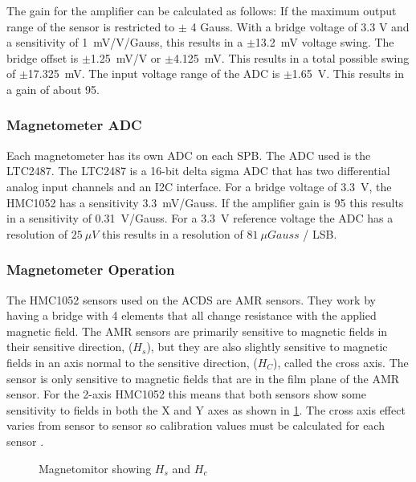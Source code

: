 The gain for the amplifier can be calculated as follows: If the maximum output range of the sensor is restricted to $\pm$ 4 Gauss. With a bridge voltage of 3.3 V and a sensitivity of 1~mV/V/Gauss, this results in a $\pm$13.2~mV voltage swing. The bridge offset is $\pm$1.25~mV/V or $\pm$4.125~mV. This results in a total possible swing of $\pm$17.325~mV. The input voltage range of the \ac{ADC} is $\pm$1.65~V. This results in a gain of about 95. 

\subsubsection{Magnetometer \acl{ADC}}

Each magnetometer has its own \ac{ADC} on each \ac{SPB}. The \ac{ADC} used is the LTC2487. The LTC2487 is a 16-bit delta sigma \ac{ADC} that has two differential analog input channels and an \ac{I2C} interface. For a bridge voltage of 3.3~V, the HMC1052 has a sensitivity 3.3~mV/Gauss. If the amplifier gain is 95 this results in a sensitivity of 0.31~V/Gauss. For a 3.3~V reference voltage the \ac{ADC} has a resolution of $25~\unit{\mu V}$ this results in a resolution of $81~\unit{\mu Gauss}$ / LSB.

\subsubsection{Magnetometer Operation}

The HMC1052 sensors used on the \ac{ACDS} are \ac{AMR} sensors. They work by having a bridge with 4 elements that all change resistance with the applied magnetic field. The \ac{AMR} sensors are primarily sensitive to magnetic fields in their sensitive direction, ($H_s$), but they are also slightly sensitive to magnetic fields in an axis normal to the sensitive direction, ($H_C$), called the cross axis. The sensor is only sensitive to magnetic fields that are in the film plane of the \ac{AMR} sensor. For the 2-axis HMC1052 this means that both sensors show some sensitivity to fields in both the X and Y axes as shown in \cref{fig:magAxisCross}. The cross axis effect varies from sensor to sensor  so calibration values must be calculated for each sensor \cite{AN215}.

\begin{figure}[H]
    \centering
    \caption{Magnetomitor showing $H_s$ and $H_c$}
    \label{fig:magAxisCross}
\end{figure}

